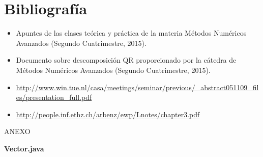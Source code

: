 \documentclass[a4paper,10pt]{article}
\begin{document}
\section{Bibliografía}
\begin{itemize}

\item Apuntes de las clases teórica y práctica de la materia Métodos Numéricos Avanzados (Segundo Cuatrimestre, 2015).

\item Documento sobre descomposición QR proporcionado por la cátedra de Métodos Numéricos Avanzados (Segundo Cuatrimestre, 2015).

\item \url{http://www.win.tue.nl/casa/meetings/seminar/previous/_abstract051109_files/presentation_full.pdf}

\item \url{http://people.inf.ethz.ch/arbenz/ewp/Lnotes/chapter3.pdf}

\end{itemize} 

\pagebreak

\begin{large}
ANEXO
\end{large}

\begin{center}
\textbf{Vector.java}
\end{center}
\end{document}
